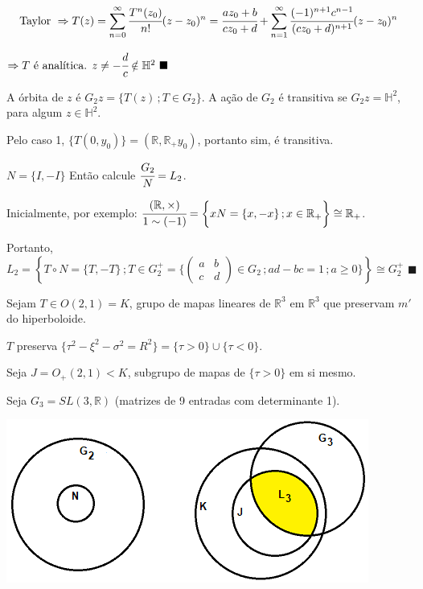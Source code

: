 \documentclass[10pt,a4paper]{article}
\begin{document}
		\begin{align}
		\text{Taylor } \Rightarrow T(z) = \sum_{n = 0}^\infty \cfrac{T^n(z_0)}{n!} (z - z_0)^n = \cfrac{az_0 + b}{cz_0 + d} + \sum_{n = 1}^\infty \cfrac{(-1)^{n + 1} c^{n - 1}}{(cz_0 + d)^{n + 1}} (z - z_0)^n \label{taylor_tz}
		\end{align}

 		$\Rightarrow T \text{ \'e anal\'itica. }z \ne -\cfrac{d}{c} \notin \mathbb{H}^2 \,\,\blacksquare$

		A \'orbita de $z$ \'e $G_2 z = \{ T(z) \,; T \in G_2 \} $. A a\c{c}\~ao de $G_2$ \'e transitiva se $G_2 z = \mathbb{H}^2$, para algum $z \in \mathbb{H}^2$.

		Pelo caso 1, $\{ T(0, y_0) \} = (\mathbb{R}, \mathbb{R}_+ y_0)$, portanto sim, \'e transitiva.

		\vspace{3mm}

		$N = \{ I, -I \}$ Ent\~ao calcule $\cfrac{G_2}{N} = L_2$.

		Inicialmente, por exemplo: $\cfrac{(\mathbb{R}, \times)}{1 \sim (-1)} = \bigg\{ xN = \{ x, -x \} \,; x \in \mathbb{R}_+ \bigg\} \cong \mathbb{R}_+$.

		Portanto, $L_2 = \left\{ T \circ N = \{ T, -T \} \,; T \in G_2^+ = \bigg\{ \left( \begin{matrix} a & b \\ c & d \end{matrix} \right) \in G_2 \,; ad - bc = 1 \,; a \ge 0 \bigg\} \right\} \cong G_2^+\,\,\blacksquare$

		\vspace{3mm}

		Sejam $T \in O(2, 1) = K$, grupo de mapas lineares de $\mathbb{R}^3$ em $\mathbb{R}^3$ que preservam $m'$ do hiperboloide.

		$T$ preserva $\{ \tau^2 - \xi^2 - \sigma^2 = R^2 \} = \{ \tau > 0 \} \cup \{ \tau < 0 \}$.

		Seja $J = O_+(2,1) < K$, subgrupo de mapas de $\{ \tau > 0 \}$ em si mesmo.

		Seja $G_3 = SL(3, \mathbb{R})$ (matrizes de 9 entradas com determinante 1).

		\begin{center}
		\includegraphics[scale=1]{diagrama_venn}
		\end{center}
\end{document}
